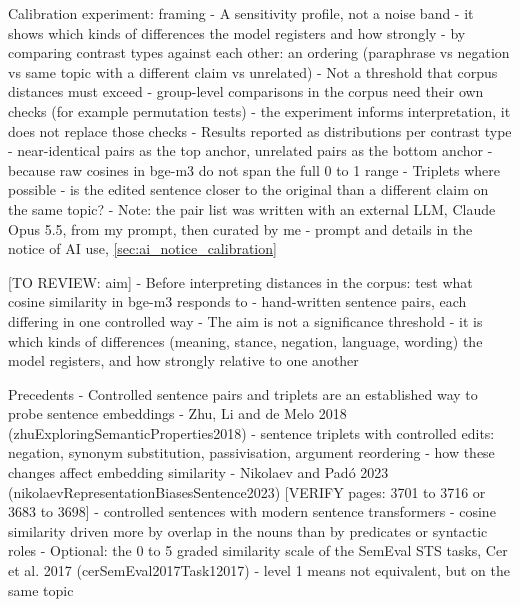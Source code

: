 Calibration experiment: framing
- A sensitivity profile, not a noise band
- it shows which kinds of differences the model registers and how strongly
- by comparing contrast types against each other: an ordering (paraphrase vs negation vs same topic with a different claim vs unrelated)
- Not a threshold that corpus distances must exceed
- group-level comparisons in the corpus need their own checks (for example permutation tests)
- the experiment informs interpretation, it does not replace those checks
- Results reported as distributions per contrast type
- near-identical pairs as the top anchor, unrelated pairs as the bottom anchor
- because raw cosines in bge-m3 do not span the full 0 to 1 range
- Triplets where possible
- is the edited sentence closer to the original than a different claim on the same topic?
- Note: the pair list was written with an external LLM, Claude Opus 5.5, from my prompt, then curated by me
- prompt and details in the notice of AI use, \ref{sec:ai_notice_calibration}

[TO REVIEW: aim]
- Before interpreting distances in the corpus: test what cosine similarity in bge-m3 responds to
- hand-written sentence pairs, each differing in one controlled way
- The aim is not a significance threshold
- it is which kinds of differences (meaning, stance, negation, language, wording) the model registers, and how strongly relative to one another

Precedents
- Controlled sentence pairs and triplets are an established way to probe sentence embeddings
- Zhu, Li and de Melo 2018 (zhuExploringSemanticProperties2018)
- sentence triplets with controlled edits: negation, synonym substitution, passivisation, argument reordering
- how these changes affect embedding similarity
- Nikolaev and Padó 2023 (nikolaevRepresentationBiasesSentence2023) [VERIFY pages: 3701 to 3716 or 3683 to 3698]
- controlled sentences with modern sentence transformers
- cosine similarity driven more by overlap in the nouns than by predicates or syntactic roles
- Optional: the 0 to 5 graded similarity scale of the SemEval STS tasks, Cer et al. 2017 (cerSemEval2017Task12017)
- level 1 means not equivalent, but on the same topic

